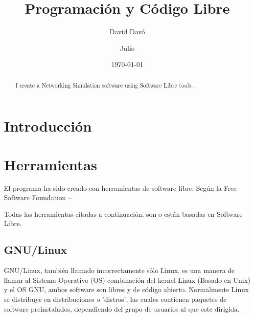 \documentclass[a4paper, 11pt, twoside]{article} %
\title{Programación y Código Libre}
\author{David Davó \and Julio}
\date{\today{}}
\begin{document}
\begin{titlepage}
{\Large\maketitle}
\end{titlepage}
\clearpage

\tableofcontents
\newpage{}

\section{Introducción}

\begin{abstract}
I create a Networking Simulation software using Software Libre tools.
\end{abstract}

\section{Herramientas}
El programa ha sido creado con herramientas de software libre. Según la Free Software Foundation
--\cite{FSF-Ph}

Todas las herramientas citadas a continuación, son o están basadas en Software Libre.

\subsection{GNU/Linux}
GNU/Linux, también llamado incorrectamente sólo Linux, es una manera de llamar al Sistema Operativo (OS) combinación del kernel Linux (Basado en Unix) y el OS GNU, ambos software son libres y de código abierto. Normalmente Linux se distribuye en distribuciones o 'distros', las cuales contienen paquetes de software preinstalados, dependiendo del grupo de usuarios al que este dirigida.
\end{document}
